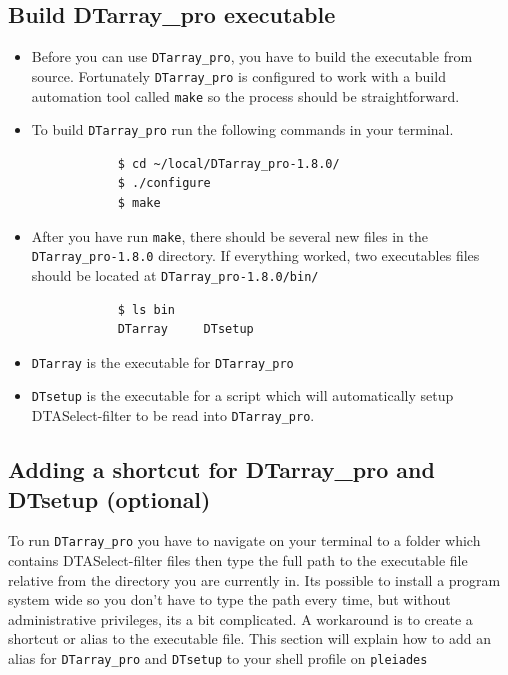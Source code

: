 \documentclass[12pt]{article}
\newcommand{\VERSION}{1.8.0}
\begin{document}
	\subsection{Build DTarray\_pro executable}
	\begin{itemize}
		\item Before you can use \texttt{DTarray\_pro}, you have to build the executable from source. Fortunately \texttt{DTarray\_pro} is configured to work with a build automation tool called \texttt{make} so the process should be straightforward.
		
		\item To build \texttt{DTarray\_pro} run the following commands in your terminal.
		
		\begin{lstlisting}
			$ cd ~/local/DTarray_pro-1.8.0/
			$ ./configure
			$ make
		\end{lstlisting}
		
		\item After you have run \texttt{make}, there should be several new files in the \texttt{DTarray\_pro-\VERSION} directory.  If everything worked, two executables files should be located at \texttt{DTarray\_pro-\VERSION/bin/}
		
		\begin{lstlisting}
			$ ls bin
			DTarray		DTsetup
		\end{lstlisting}
		
		\item \texttt{DTarray} is the executable for \texttt{DTarray\_pro}
		
		\item \texttt{DTsetup} is the executable for a script which will automatically setup DTASelect-filter to be read into \texttt{DTarray\_pro}.
		
	\end{itemize}

	\subsection{Adding a shortcut for DTarray\_pro and DTsetup (optional)}
	
	To run \texttt{DTarray\_pro} you have to navigate on your terminal to a folder which contains DTASelect-filter files then type the full path to the executable file relative from the directory you are currently in.  Its possible to install a program system wide so you don't have to type the path every time, but without administrative privileges, its a bit complicated. A workaround is to create a shortcut or alias to the executable file.  This section will explain how to add an alias for \texttt{DTarray\_pro} and \texttt{DTsetup} to your shell profile on \texttt{pleiades}
	
\end{document}
